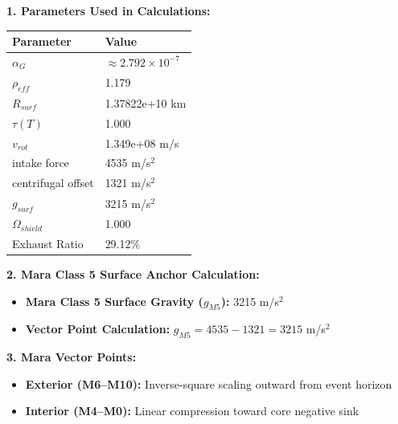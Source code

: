 \documentclass[11pt, a4paper]{article}
\begin{document}
\vspace{0.5em}
\noindent \textbf{1. Parameters Used in Calculations:}
\begin{center}
  \begin{tabular}{|l|l|}
    \hline
    \textbf{Parameter} & \textbf{Value} \\ \hline
    $\alpha_G$ & $\approx 2.792 \times 10^{-7}$ \\ \hline
    $\rho_{eff}$ & 1.179 \\ \hline
    $R_{surf}$ & 1.37822e+10 km \\ \hline
    $\tau(T)$ & 1.000 \\ \hline
    $v_{rot}$ & 1.349e+08 m/s \\ \hline
    intake force & 4535 m/s$^2$ \\ \hline
    centrifugal offset & 1321 m/s$^2$ \\ \hline
    $g_{surf}$ & 3215 m/s$^2$ \\ \hline
    $\Omega_{shield}$ & 1.000 \\ \hline
    Exhaust Ratio & 29.12\% \\ \hline
  \end{tabular}
\end{center}

\vspace{0.5em}
\noindent \textbf{2. Mara Class 5 Surface Anchor Calculation:}
\begin{itemize}
  \item \textbf{Mara Class 5 Surface Gravity ($g_{M5}$):} 3215 m/s$^2$
  \item \textbf{Vector Point Calculation:} $g_{M5} = 4535 - 1321 = 3215$ m/s$^2$
\end{itemize}

\vspace{0.5em}
\noindent \textbf{3. Mara Vector Points:}
\begin{itemize}
  \item \textbf{Exterior (M6--M10):} Inverse-square scaling outward from event horizon
  \item \textbf{Interior (M4--M0):} Linear compression toward core negative sink
\end{itemize}
\end{document}
